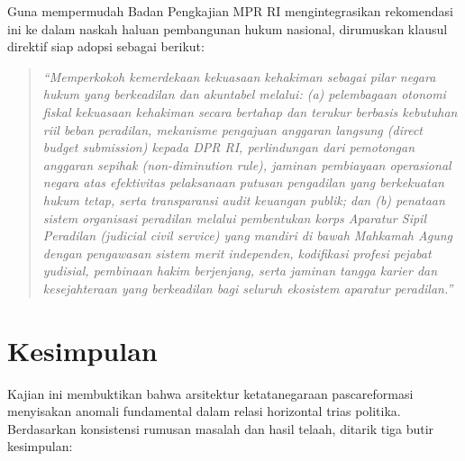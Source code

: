 \documentclass[12pt,a4paper,twocolumn]{article}
\begin{document}
Guna mempermudah Badan Pengkajian MPR RI mengintegrasikan rekomendasi ini ke dalam naskah haluan pembangunan hukum nasional, dirumuskan klausul direktif siap adopsi sebagai berikut:

\begin{quote}
\small
\textit{``Memperkokoh kemerdekaan kekuasaan kehakiman sebagai pilar negara hukum yang berkeadilan dan akuntabel melalui: (a) pelembagaan otonomi fiskal kekuasaan kehakiman secara bertahap dan terukur berbasis kebutuhan riil beban peradilan, mekanisme pengajuan anggaran langsung (direct budget submission) kepada DPR RI, perlindungan dari pemotongan anggaran sepihak (non-diminution rule), jaminan pembiayaan operasional negara atas efektivitas pelaksanaan putusan pengadilan yang berkekuatan hukum tetap, serta transparansi audit keuangan publik; dan (b) penataan sistem organisasi peradilan melalui pembentukan korps Aparatur Sipil Peradilan (judicial civil service) yang mandiri di bawah Mahkamah Agung dengan pengawasan sistem merit independen, kodifikasi profesi pejabat yudisial, pembinaan hakim berjenjang, serta jaminan tangga karier dan kesejahteraan yang berkeadilan bagi seluruh ekosistem aparatur peradilan.''}
\end{quote}

\section{Kesimpulan}

Kajian ini membuktikan bahwa arsitektur ketatanegaraan pascareformasi menyisakan anomali fundamental dalam relasi horizontal trias politika. Berdasarkan konsistensi rumusan masalah dan hasil telaah, ditarik tiga butir kesimpulan:
\end{document}
